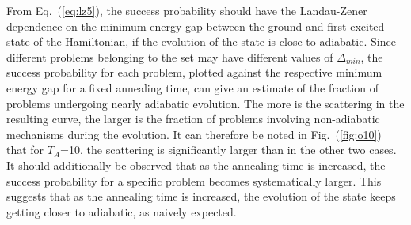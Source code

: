 \documentclass[../main.tex]{subfiles}
\begin{document}
From Eq.~(\ref{eq:lz5}), the success probability should have the Landau-Zener dependence on the minimum energy gap between the ground and first excited state of the Hamiltonian, if the evolution of the state is close to adiabatic. Since different problems belonging to the set may have different values of $\Delta_{min}$, the success probability for each problem, plotted against the respective minimum energy gap for a fixed annealing time, can give an estimate of the fraction of problems undergoing nearly adiabatic evolution. The more is the scattering in the resulting curve, the larger is the fraction of problems involving non-adiabatic mechanisms during the evolution. It can therefore be noted in Fig.~(\ref{fig:o10}) that for $T_A$=10, the scattering is significantly larger than in the other two cases. It should additionally be observed that as the annealing time is increased, the success probability for a specific problem becomes systematically larger. This suggests that as the annealing time is increased, the evolution of the state keeps getting closer to adiabatic, as naively expected.
\end{document}
